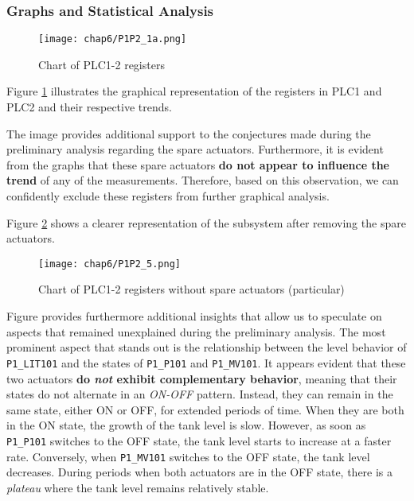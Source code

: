 \subsubsection{Graphs and Statistical Analysis}
\label{subsubsec:6_P1P2_graphs}

\begin{figure}[ht]
	\centering
	\texttt{[image: chap6/P1P2\_1a.png]}
	\caption{Chart of PLC1-2 registers}
	\label{fig:6_P1P2_graph_full}
\end{figure}

Figure \ref{fig:6_P1P2_graph_full} illustrates the graphical representation of the registers in PLC1 and PLC2 and their respective trends.

The image provides additional support to the conjectures made during the preliminary analysis regarding the spare actuators. Furthermore, it is evident from the graphs that these spare actuators \textbf{do not appear to influence the trend} of any of the measurements. Therefore, based on this observation, we can confidently exclude these registers from further graphical analysis.

\bigskip
Figure \ref{fig:6_P1P2_graph_full_nospare} shows a clearer representation of the subsystem after removing the spare actuators.

\begin{figure}[ht]
	\centering
	\texttt{[image: chap6/P1P2\_5.png]}
	\caption{Chart of PLC1-2 registers without spare actuators (particular)}
	\label{fig:6_P1P2_graph_full_nospare}
\end{figure}

Figure %
provides furthermore additional insights that allow us to speculate on aspects that remained unexplained during the preliminary analysis. The most prominent aspect that stands out is the relationship between the level behavior of \texttt{P1\_LIT101} and the states of \texttt{P1\_P101} and \texttt{P1\_MV101}. It appears evident that these two actuators \textbf{do \textit{not} exhibit complementary behavior}, meaning that their states do not alternate in an \textit{ON-OFF} pattern. Instead, they can remain in the same state, either ON or OFF, for extended periods of time. When they are both in the ON state, the growth of the tank level is slow. However, as soon as \texttt{P1\_P101} switches to the OFF state, the tank level starts to increase at a faster rate. Conversely, when \texttt{P1\_MV101} switches to the OFF state, the tank level decreases. During periods when both actuators are in the OFF state, there is a \textit{plateau} where the tank level remains relatively stable.

